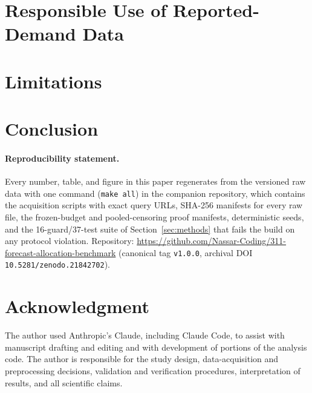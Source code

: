 \documentclass[11pt]{article}
\begin{document}
\section{Responsible Use of Reported-Demand Data}\label{sec:responsible}


\section{Limitations}\label{sec:limits}


\section{Conclusion}\label{sec:conclusion}


\paragraph*{Reproducibility statement.}
Every number, table, and figure in this paper regenerates from the
versioned raw data with one command (\texttt{make all}) in the companion
repository, which contains the acquisition scripts with exact query URLs,
SHA-256 manifests for every raw file, the frozen-budget and
pooled-censoring proof manifests, deterministic seeds, and the
16-guard/37-test suite of Section~\ref{sec:methods} that fails the build on any protocol
violation. Repository:
\url{https://github.com/Nassar-Coding/311-forecast-allocation-benchmark}
(canonical tag \texttt{v1.0.0}, archival DOI
\texttt{10.5281/zenodo.21842702}).


\section*{Acknowledgment}
The author used Anthropic's Claude, including Claude Code, to assist
with manuscript drafting and editing and with development of portions of
the analysis code. The author is responsible for the study design,
data-acquisition and preprocessing decisions, validation and
verification procedures, interpretation of results, and all scientific
claims.



\end{document}
